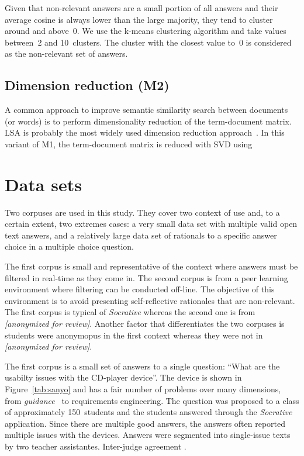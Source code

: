 \documentclass{edm_template}
\newcommand{\dalite}{\textit{[anonymized for review]}}
\begin{document}
Given that non-relevant answers are a small portion of all answers and their average cosine is always lower than the large majority, they tend to cluster around and above~0.  We use the k-means clustering algorithm and take values between~2 and 10~clusters.  The cluster with the closest value to~0 is considered as the non-relevant set of answers.


\subsection{Dimension reduction (M2)}

A common approach to improve semantic similarity search between documents (or words) is to perform dimensionality reduction of the term-document matrix.  LSA is probably the most widely used dimension reduction approach~\cite{dumais2004latent}.  In this variant of M1, the term-document matrix is reduced with SVD using 


\section{Data sets}

Two corpuses are used in this study.  They cover two context of use and, to a certain extent, two extremes cases: a very small data set with multiple valid open text answers, and a relatively large data set of rationals to a specific answer choice in a multiple choice question.

The first corpus is small and representative of the context where answers must be filtered in real-time as they come in.  The second corpus is from a peer learning environment where filtering can be conducted off-line.  The objective of this environment is to avoid presenting self-reflective rationales that are non-relevant.  The first corpus is typical of \textit{Socrative} whereas the second one is from \textit{\dalite}.  Another factor that differentiates the two corpuses is students were anonymopus in the first context whereas they were not in \textit{\dalite}.

The first corpus is a small set of answers to a single question: ``What are the usabilty issues with the CD-player device''.  The device is shown in Figure~\ref{tab:sanyo} and has a fair number of problems over many dimensions, from \textit{guidance}~\cite{scapin1997ergonomic} to requirements engineering.  The question was proposed to a class of approximately 150~students and the students answered through the \textit{Socrative} application.  Since there are multiple good answers, the answers often reported multiple issues with the devices.  Answers were segmented into single-issue texts by two teacher assistantes.  Inter-judge agreement .
\end{document}
